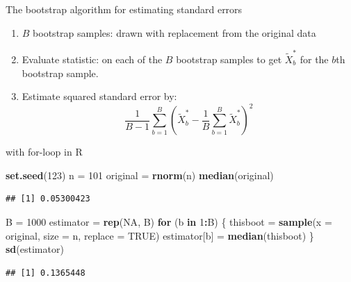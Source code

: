 \documentclass[10pt,ignorenonframetext,]{beamer}
\newenvironment{Shaded}{\begin{snugshade}}{\end{snugshade}}
\newcommand{\KeywordTok}[1]{\textcolor[rgb]{0.13,0.29,0.53}{\textbf{#1}}}
\newcommand{\DataTypeTok}[1]{\textcolor[rgb]{0.13,0.29,0.53}{#1}}
\newcommand{\DecValTok}[1]{\textcolor[rgb]{0.00,0.00,0.81}{#1}}
\newcommand{\StringTok}[1]{\textcolor[rgb]{0.31,0.60,0.02}{#1}}
\newcommand{\OtherTok}[1]{\textcolor[rgb]{0.56,0.35,0.01}{#1}}
\newcommand{\ControlFlowTok}[1]{\textcolor[rgb]{0.13,0.29,0.53}{\textbf{#1}}}
\newcommand{\OperatorTok}[1]{\textcolor[rgb]{0.81,0.36,0.00}{\textbf{#1}}}
\newcommand{\NormalTok}[1]{#1}
\begin{document}
\begin{frame}

\begin{block}{The bootstrap algorithm for estimating standard errors}

\begin{enumerate}
\def\labelenumi{\arabic{enumi}.}
\item
  \(B\) bootstrap samples: drawn with replacement from the original data
\item
  Evaluate statistic: on each of the \(B\) bootstrap samples to get
  \(\tilde{X}^*_b\) for the \(b\)th bootstrap sample.
\item
  Estimate squared standard error by:
  \[\frac{1}{B-1}\sum_{b=1}^B (\tilde{X}^*_b-\frac{1}{B}\sum_{b=1}^B \tilde{X}^*_b)^2\]
\end{enumerate}

\end{block}

\end{frame}

\begin{frame}[fragile]

\begin{block}{with for-loop in R}

\begin{Shaded}
\begin{Highlighting}[]
\KeywordTok{set.seed}\NormalTok{(}\DecValTok{123}\NormalTok{)}
\NormalTok{n =}\StringTok{ }\DecValTok{101}
\NormalTok{original =}\StringTok{ }\KeywordTok{rnorm}\NormalTok{(n)}
\KeywordTok{median}\NormalTok{(original)}
\end{Highlighting}
\end{Shaded}

\begin{verbatim}
## [1] 0.05300423
\end{verbatim}

\begin{Shaded}
\begin{Highlighting}[]
\NormalTok{B =}\StringTok{ }\DecValTok{1000}
\NormalTok{estimator =}\StringTok{ }\KeywordTok{rep}\NormalTok{(}\OtherTok{NA}\NormalTok{, B)}
\ControlFlowTok{for}\NormalTok{ (b }\ControlFlowTok{in} \DecValTok{1}\OperatorTok{:}\NormalTok{B) \{}
\NormalTok{    thisboot =}\StringTok{ }\KeywordTok{sample}\NormalTok{(}\DataTypeTok{x =}\NormalTok{ original, }\DataTypeTok{size =}\NormalTok{ n, }\DataTypeTok{replace =} \OtherTok{TRUE}\NormalTok{)}
\NormalTok{    estimator[b] =}\StringTok{ }\KeywordTok{median}\NormalTok{(thisboot)}
\NormalTok{\}}
\KeywordTok{sd}\NormalTok{(estimator)}
\end{Highlighting}
\end{Shaded}

\begin{verbatim}
## [1] 0.1365448
\end{verbatim}

\end{block}

\end{frame}
\end{document}
